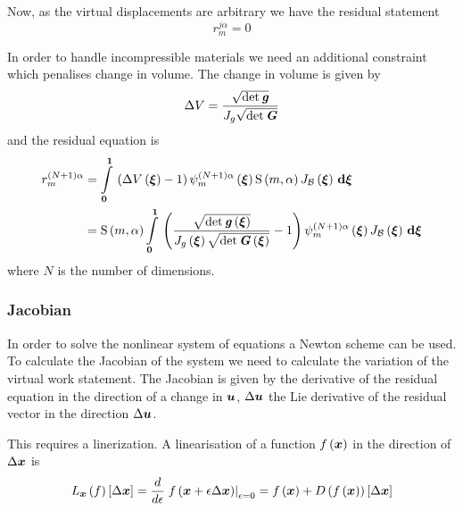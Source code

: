 Now, as the virtual displacements are arbitrary we have the residual statement
\begin{equation}
  r_{m}^{j\alpha}=0
\end{equation}

In order to handle incompressible materials we need an additional constraint
which penalises change in volume. The change in volume is given by
\begin{equation}
  \Delta V = \dfrac{\sqrt{\det \boldsymbol{\mathit{g}}}}{J_{g}\sqrt{\det \boldsymbol{\mathit{G}}}}
\end{equation}
and the residual equation is
\begin{equation}
  \begin{split}
    r_{m}^{\left( N+1 \right)\alpha}&=  \displaystyle\int\limits_{\boldsymbol{0}}^{\boldsymbol{1}} \,\left(  \Delta V\left( \boldsymbol{\xi} \right)  -
        1 \right)   \psi_{m}^{\left( N+1 \right)\alpha} \left( \boldsymbol{\xi} \right)     \mathrm{S} \left( m,\alpha \right)   J_{ \mathcal{B} }\left( \boldsymbol{\xi} \right) \, \boldsymbol{\mathrm{d}} \boldsymbol{\xi} 
    \\
    &=   \mathrm{S} \left( m,\alpha \right)    \displaystyle\int\limits_{\boldsymbol{0}}^{\boldsymbol{1}} \,\left( \dfrac{\sqrt{\det
             \boldsymbol{\mathit{g}}\left( \boldsymbol{\xi} \right) }}{ J_{g}\left( \boldsymbol{\xi} \right) \sqrt{\det
             \boldsymbol{\mathit{G}}\left( \boldsymbol{\xi} \right) }} -
        1 \right)   \psi_{m}^{\left( N+1 \right)\alpha} \left( \boldsymbol{\xi} \right)   J_{ \mathcal{B} }\left( \boldsymbol{\xi} \right) \, \boldsymbol{\mathrm{d}} \boldsymbol{\xi} 
  \end{split}
\end{equation}
where $N$ is the number of dimensions.

\subsubsection{Jacobian}

In order to solve the nonlinear system of equations a Newton scheme can be
used. To calculate the Jacobian of the system we need to calculate the
variation of the virtual work statement. The Jacobian is given by the
derivative of the residual equation in the direction of a change in
$\boldsymbol{u}$, $\Delta{\ensuremath{\boldsymbol{u}}}$ \ie the Lie derivative of the residual vector
in the direction $\Delta{\ensuremath{\boldsymbol{u}}}$.

This requires a linerization. A linearisation of a function
$ f\left( \boldsymbol{x} \right) $ in the direction of $\Delta\boldsymbol{x}$ is
\begin{equation}
  \linearisation{f}{\vectr{x}}{\Delta\vectr{x}}=\dby{}{\epsilon}\evalat{\fnof{f}{\vectr{x}+\epsilon\Delta\vectr{x}}}{\epsilon=0}=\fnof{f}{\vectr{x}}+\directionalderiv{\fnof{f}{\vectr{x}}}{\Delta\vectr{x}}
\end{equation}

